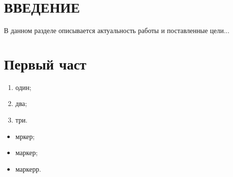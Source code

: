 \documentclass[paper=a4, fontsize=14pt, pagesize, DIV=calc, oneside]{scrreport}
\begin{document}
\pagestyle{empty} 



\newpage
\tableofcontents
\newpage

\pagestyle{plain}
\setcounter{page}{2} 



\chapter*{ВВЕДЕНИЕ}











В данном разделе описывается актуальность работы и поставленные цели...





\chapter{Первый част}









\begin{enumerate}

    \item один;

    \item два;

    \item три.

\end{enumerate}


\begin{itemize}

    \item мркер;

    \item маркер;

    \item маркерр.

\end{itemize}
\end{document}
